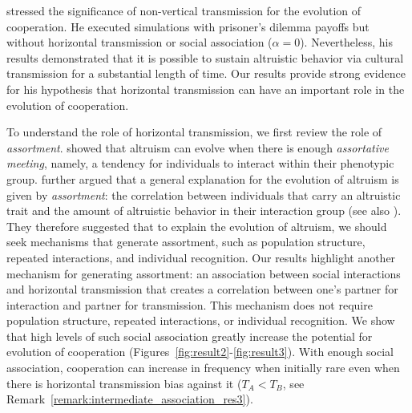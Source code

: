 \documentclass[12pt]{extarticle}
\begin{document}
\citet{woodcock2006significance} stressed the significance of non-vertical transmission for the evolution of cooperation. He executed simulations with prisoner's dilemma payoffs but without horizontal transmission or social association ($\alpha=0$). Nevertheless, his results demonstrated that it is possible to sustain altruistic behavior via cultural transmission for a substantial length of time.
Our results provide strong evidence for his hypothesis that horizontal transmission can have an important role in the evolution of cooperation. 

To understand the role of horizontal transmission, we first review the role of \emph{assortment}.
\citet{Eshel1982} showed that altruism can evolve when there is enough \emph{assortative meeting}, namely, a tendency for individuals to interact within their phenotypic group.
\citet{Fletcher2009assortment}  further argued that a general explanation for the evolution of altruism is given by \emph{assortment}: the correlation between individuals that carry an altruistic trait and the amount of altruistic behavior in their interaction group (see also \citet{Bijma2010assortment}).
They therefore suggested that to explain the evolution of altruism, we should seek mechanisms that generate  assortment, such as population structure, repeated interactions, and individual recognition.
Our results highlight another mechanism for generating assortment: an association between social interactions and horizontal transmission that creates a correlation between one's partner for interaction and partner for transmission.
This mechanism does not require population structure, repeated interactions, or individual recognition.
We show that high levels of such social association greatly increase the potential for evolution of cooperation (Figures~\ref{fig:result2}-\ref{fig:result3}).
With enough social association, cooperation can increase in frequency when initially rare even when there is horizontal transmission bias against it ($T_A<T_B$, see Remark~\ref{remark:intermediate_association_res3}).
\end{document}
